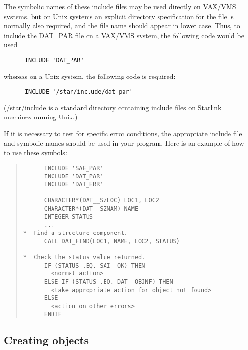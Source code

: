 The symbolic names of these include files may be used directly on VAX/VMS
systems, but on Unix systems an explicit directory specification for the file
is normally also required, and the file name should appear in lower case.
Thus, to include the DAT\_PAR file on a VAX/VMS system, the following code
would be used:

\begin{small}
\begin{verbatim}
      INCLUDE 'DAT_PAR'
\end{verbatim}
\end{small}

whereas on a Unix system, the following code is required:

\begin{small}
\begin{verbatim}
      INCLUDE '/star/include/dat_par'
\end{verbatim}
\end{small}

(/star/include is a standard directory containing include files on Starlink
machines running Unix.)

If it is necessary to test for specific error conditions, the appropriate
include file and symbolic names should be used in your program.
Here is an example of how to use these symbols: 

\begin{quote}

\begin{small}
\begin{verbatim}
      INCLUDE 'SAE_PAR'
      INCLUDE 'DAT_PAR'
      INCLUDE 'DAT_ERR'
      ...
      CHARACTER*(DAT__SZLOC) LOC1, LOC2
      CHARACTER*(DAT__SZNAM) NAME
      INTEGER STATUS
      ...
*  Find a structure component.
      CALL DAT_FIND(LOC1, NAME, LOC2, STATUS)

*  Check the status value returned.
      IF (STATUS .EQ. SAI__OK) THEN
        <normal action>
      ELSE IF (STATUS .EQ. DAT__OBJNF) THEN
        <take appropriate action for object not found>
      ELSE
        <action on other errors>
      ENDIF
\end{verbatim}
\end{small}

\end{quote}

\subsection{Creating objects}
\label{S_creating}


